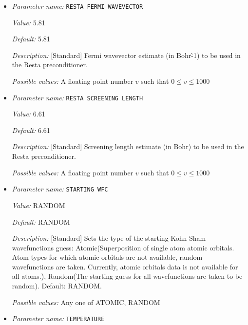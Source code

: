 \begin{itemize}
{\it Possible values:} A floating point number $v$ such that $-1e-12 \leq v \leq 10$
\item {\it Parameter name:} {\tt RESTA FERMI WAVEVECTOR}
\label{parameters:SCF parameters/RESTA FERMI WAVEVECTOR}
\label{parameters:SCF_20parameters/RESTA_20FERMI_20WAVEVECTOR}


{\it Value:} 5.81


{\it Default:} 5.81


{\it Description:} [Standard] Fermi wavevector estimate (in Bohr\^-1) to be used in the Resta preconditioner.


{\it Possible values:} A floating point number $v$ such that $0 \leq v \leq 1000$
\item {\it Parameter name:} {\tt RESTA SCREENING LENGTH}
\label{parameters:SCF parameters/RESTA SCREENING LENGTH}
\label{parameters:SCF_20parameters/RESTA_20SCREENING_20LENGTH}


{\it Value:} 6.61


{\it Default:} 6.61


{\it Description:} [Standard] Screening length estimate (in Bohr) to be used in the Resta preconditioner.


{\it Possible values:} A floating point number $v$ such that $0 \leq v \leq 1000$
\item {\it Parameter name:} {\tt STARTING WFC}
\label{parameters:SCF parameters/STARTING WFC}
\label{parameters:SCF_20parameters/STARTING_20WFC}


{\it Value:} RANDOM


{\it Default:} RANDOM


{\it Description:} [Standard] Sets the type of the starting Kohn-Sham wavefunctions guess: Atomic(Superposition of single atom atomic orbitals. Atom types for which atomic orbitals are not available, random wavefunctions are taken. Currently, atomic orbitals data is not available for all atoms.), Random(The starting guess for all wavefunctions are taken to be random). Default: RANDOM.


{\it Possible values:} Any one of ATOMIC, RANDOM
\item {\it Parameter name:} {\tt TEMPERATURE}
\label{parameters:SCF parameters/TEMPERATURE}
\label{parameters:SCF_20parameters/TEMPERATURE}



\end{itemize}
